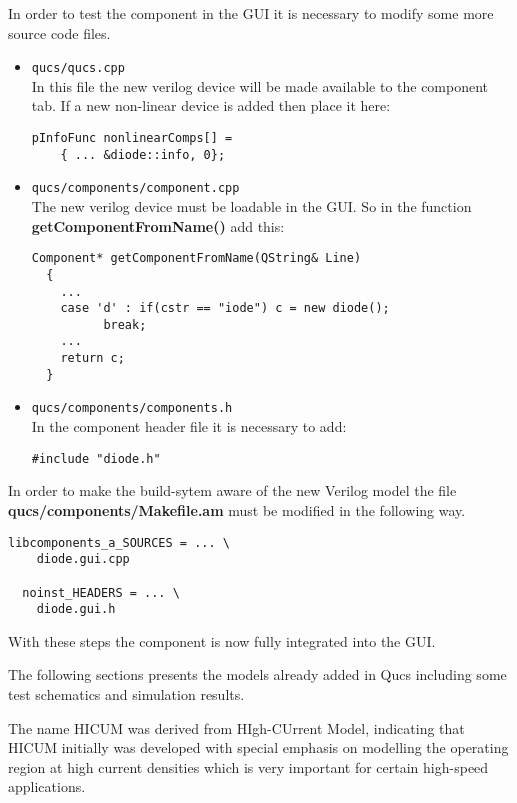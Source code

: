 In order to test the component in the GUI it is necessary to modify
some more source code files.
\begin{itemize}
\item \Verb+qucs/qucs.cpp+\\
In this file the new verilog device will be made available to the
component tab.  If a new non-linear device is added then place it here:
\begin{Verbatim}[fontsize=\small]
  pInfoFunc nonlinearComps[] =
    { ... &diode::info, 0};
\end{Verbatim}
\item \Verb+qucs/components/component.cpp+\\
The new verilog device must be loadable in the GUI.  So in the function
\textbf{getComponentFromName()} add this:
\begin{Verbatim}[fontsize=\small]
  Component* getComponentFromName(QString& Line)
  {
    ...
    case 'd' : if(cstr == "iode") c = new diode();
          break;
    ...
    return c;
  }
\end{Verbatim}
\item \Verb+qucs/components/components.h+\\
In the component header file it is necessary to add:
\begin{Verbatim}[fontsize=\small]
  #include "diode.h"
\end{Verbatim}
\end{itemize}

In order to make the build-sytem aware of the new Verilog model the
file \textbf{qucs/components/Makefile.am} must be modified in the
following way.
\begin{Verbatim}[fontsize=\small]
  libcomponents_a_SOURCES = ... \
    diode.gui.cpp

  noinst_HEADERS = ... \
    diode.gui.h
\end{Verbatim}

With these steps the component is now fully integrated into the GUI.  

\tutsubsection{Implemented devices}

The following sections presents the models already added in Qucs
including some test schematics and simulation results.


The name HICUM was derived from HIgh-CUrrent Model, indicating that
HICUM initially was developed with special emphasis on modelling the
operating region at high current densities which is very important for
certain high-speed applications.

